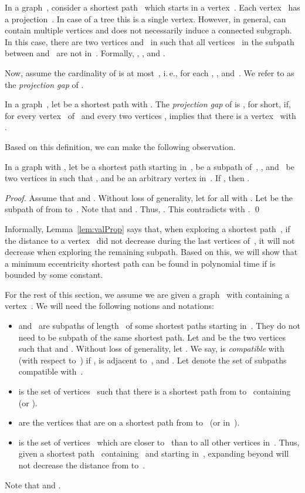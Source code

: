 \documentclass[10pt]{llncs}
\makeatletter
\newcommand{\ie}{i.\,e.\@ifnextchar{,}{}{~}}
\makeatother
\begin{document}
In a graph~, consider a shortest path~ which starts in a vertex~.
Each vertex~ has a projection~.
In case of a tree this is a single vertex.
However, in general,  can contain multiple vertices and does not necessarily induce a connected subgraph.
In this case, there are two vertices  and~ in  such that all vertices~ in the subpath~ between  and~ are not in~.
Formally, , , and .

Now, assume the cardinality of  is at most~, \ie,  for each , ,  and~.
We refer to  as the \emph{projection gap} of .

\begin{definition}
In a graph~, let  be a shortest path with .
The \emph{projection gap} of  is ,  for short, if, for every vertex~ of~ and every two vertices ,  implies that there is a vertex~ with .
\end{definition}

Based on this definition, we can make the following observation.

\begin{lemma}
    \label{lem:valProp}
In a graph  with , let  be a shortest path starting in~,  be a subpath of~, ,  and~ be two vertices in  such that , and  be an arbitrary vertex in~.
If , then .
\end{lemma}

\begin{proof}
Assume that  and .
Without loss of generality, let  for all  with .
Let  be the subpath of  from  to~.
Note that  and .
Thus, .
This contradicts with .
\qed
\end{proof}

Informally, Lemma~\ref{lem:valProp} says that, when exploring a shortest path~, if the distance to a vertex~ did not decrease during the last  vertices of~, it will not decrease when exploring the remaining subpath.
Based on this, we will show that a minimum eccentricity shortest path can be found in polynomial time if  is bounded by some constant.

For the rest of this section, we assume we are given a graph~ with  containing a vertex~.
We will need the following notions and notations:
\begin{itemize}
\item
 and~ are subpaths of length~ of some shortest paths starting in~.
They do not need to be subpath of the same shortest path.
Let  and  be the two vertices such that  and  .
Without loss of generality, let .
We say,  is \emph{compatible} with  (with respect to~) if ,  is adjacent to~, and .
Let  denote the set of subpaths compatible with~.

\item
 is the set of vertices~ such that there is a shortest path from  to~ containing  (or ).

\item
 are the vertices that are on a shortest path from  to~ (or in~).

\item
 is the set of vertices~ which are closer to~ than to all other vertices in~.
Thus, given a shortest path~ containing~ and starting in~, expanding  beyond  will not decrease the distance from  to~.
\end{itemize}
Note that  and .
\end{document}
